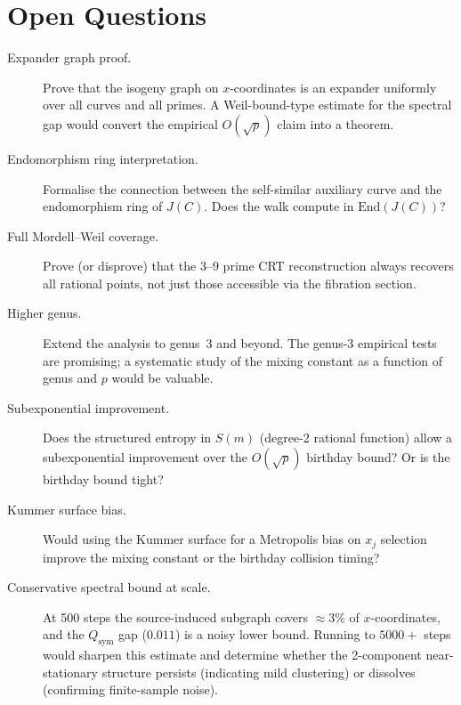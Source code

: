 \documentclass[11pt]{article}
\theoremstyle{definition}
\theoremstyle{remark}
\newcommand{\End}{\mathrm{End}}
\newcommand{\BigO}[1]{O\!\left(#1\right)}
\begin{document}
\section{Open Questions}
\label{sec:open}

\begin{description}
  \item[Expander graph proof.]
    Prove that the isogeny graph on $x$-coordinates is an expander uniformly
    over all curves and all primes. A Weil-bound-type estimate for the spectral
    gap would convert the empirical $\BigO{\sqrt{p}}$ claim into a theorem.

  \item[Endomorphism ring interpretation.]
    Formalise the connection between the self-similar auxiliary curve and the
    endomorphism ring of $J(C)$. Does the walk compute in $\End(J(C))$?

  \item[Full Mordell--Weil coverage.]
    Prove (or disprove) that the 3--9 prime CRT reconstruction always recovers
    all rational points, not just those accessible via the fibration section.

  \item[Higher genus.]
    Extend the analysis to genus~3 and beyond. The genus-3 empirical tests are
    promising; a systematic study of the mixing constant as a function of genus
    and $p$ would be valuable.

  \item[Subexponential improvement.]
    Does the structured entropy in $S(m)$ (degree-2 rational function) allow a
    subexponential improvement over the $\BigO{\sqrt{p}}$ birthday bound? Or is
    the birthday bound tight?

  \item[Kummer surface bias.]
    Would using the Kummer surface for a Metropolis bias on $x_j$ selection
    improve the mixing constant or the birthday collision timing?

  \item[Conservative spectral bound at scale.]
    At 500 steps the source-induced subgraph covers ${\approx}3\%$ of
    $x$-coordinates, and the $Q_\text{sym}$ gap ($0.011$) is a noisy lower
    bound. Running to $5000+$ steps would sharpen this estimate and determine
    whether the 2-component near-stationary structure persists (indicating mild
    clustering) or dissolves (confirming finite-sample noise).
\end{description}
\end{document}
